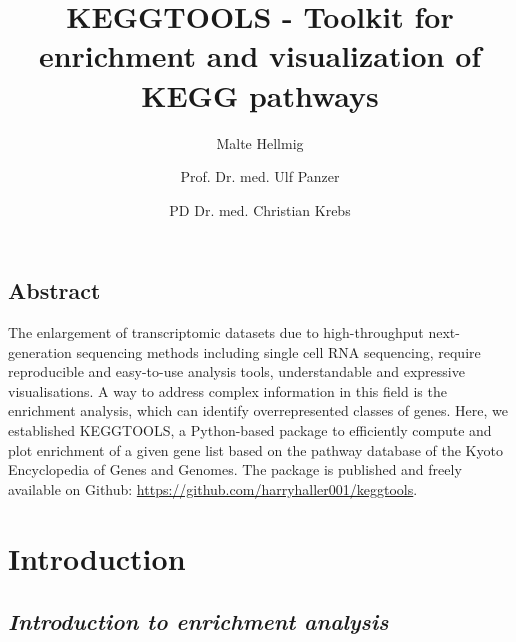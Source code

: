 \documentclass[11pt,a4paper]{article}
\begin{document}
\begin{titlepage}

    \title{KEGGTOOLS - Toolkit for enrichment and visualization of KEGG pathways}

    \author[1]{Malte Hellmig}

    \author[1, 2]{Prof. Dr. med. Ulf Panzer}
    \author[1, 2]{PD Dr. med. Christian Krebs}

    \date{}
    \clearpage\maketitle
    \thispagestyle{empty}


    \section*{Abstract}

The enlargement of transcriptomic datasets due to high-throughput next-generation
sequencing methods including single cell RNA sequencing, require reproducible and
easy-to-use analysis tools, understandable and expressive visualisations.
A way to address complex information in this field is the enrichment analysis,
which can identify overrepresented classes of genes.
Here, we established KEGGTOOLS, a Python-based package to efficiently compute
and plot enrichment of a
given gene list based on the pathway database of the Kyoto Encyclopedia
of Genes and Genomes. The package is published and freely available on Github:
\mbox{\url{https://github.com/harryhaller001/keggtools}}.

\end{titlepage}

\newpage
\setcounter{page}{1}

\section*{Introduction}

\subsection*{\textit{Introduction to enrichment analysis}}
\end{document}
